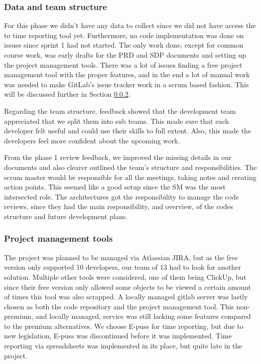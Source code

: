 \documentclass{article}
\begin{document}
\subsubsection{Data and team structure}
For this phase we didn't have any data to collect since we did not have access the to time reporting tool yet. Furthermore, no code implementation was done on issues since sprint 1 had not started. The only work done, except for common course work, was early drafts for the PRD and SDP documents and setting up the project management tools. There was a lot of issues finding a free project management tool with the proper features, and in the end a lot of manual work was needed to make GitLab's issue tracker work in a scrum based fashion. This will be discussed further in Section \ref{project_tools}.

Regarding the team structure, feedback showed that the development team appreciated that we split them into sub teams. This made sure that each developer felt useful and could use their skills to full extent. Also, this made the developers feel more confident about the upcoming work. 

From the phase 1 review feedback, we improved the missing details in our documents and also clearer outlined the team's structure and responsibilities. The scrum master would be responsible for all the meetings, taking notes and creating action points. This seemed like a good setup since the SM was the most intersected role. The architectures got the responsibility to manage the code reviews, since they had the main responsibility, and overview, of the codes structure and future development plans.

\subsubsection{Project management tools}\label{project_tools}

The project was planned to be managed via Atlassian JIRA, but as the free version only supported 10 developers, our team of 13 had to look for another solution. Multiple other tools were considered, one of them being ClickUp, but since their free version only allowed some objects to be viewed a certain amount of times this tool was also scrapped. A locally managed gitlab server was lastly chosen as both the code repository and the project management tool. This non-premium, and locally managed, service was still lacking some features compared to the premium alternatives. We choose E-puss for time reporting, but due to new legislation, E-puss was discontinued before it was implemented. Time reporting via spreadsheets was implemented in its place, but quite late in the project.
\end{document}
